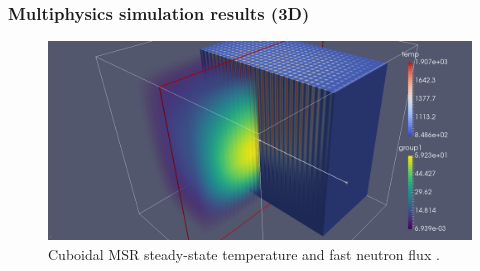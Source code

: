 \begin{frame}
  \frametitle{Multiphysics simulation results (3D)}
  \begin{figure}[t]
   \vspace{-0.1in}
   \hspace*{-0.45in}
   \includegraphics[height=0.75\textheight]{./images/moltres_3D.png}
   \caption{Cuboidal \gls{MSR} steady-state temperature and fast neutron flux \cite{ridley_moltres_2017}.}
    \end{figure}

\end{frame}
